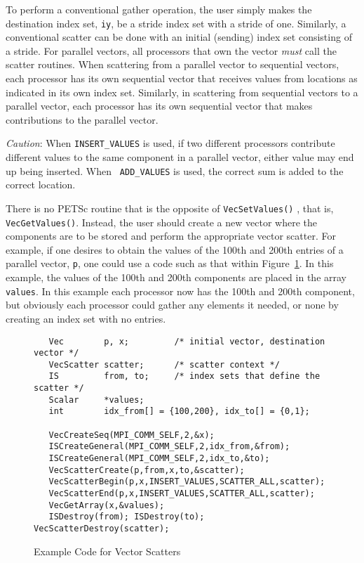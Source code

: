 To perform a conventional gather operation, the user simply makes
 the destination index set, 
{\tt iy}, be a stride index set with a stride of one.  Similarly, a 
conventional scatter can be done with an initial (sending) index set 
consisting of a stride.  For parallel vectors, all processors that own 
the vector {\em must} call the scatter routines. When scattering from a 
parallel vector to sequential vectors, each processor has its own sequential 
vector that receives values from locations as indicated in its own 
index set. Similarly, in scattering
from sequential vectors to a parallel vector, each processor has its
own sequential vector that makes contributions to the parallel vector.

{\em Caution}: When {\tt INSERT\_VALUES} is used, if two different
processors contribute different values to the same component in a
parallel vector, either value may end up being inserted. When {\tt
ADD\_VALUES} is used, the correct sum is added to the correct
location.

 
There is no PETSc routine that is the opposite of {\tt VecSetValues()}
, that is, {\tt VecGetValues()}. 
Instead, the user should create a new vector where
the components are to be stored and perform the appropriate vector 
scatter. For example, if one desires to obtain the values of the 
100th and 200th entries of a parallel vector, {\tt p}, one could use 
a code such as that within Figure~\ref{fig:vecscatter}.
In this example, the values of the 100th and 200th components are
placed in the array 
{\tt values}. In this example each processor now has the 100th and 
200th component, but obviously each processor could gather any 
elements it needed, or none by creating an index set with no entries.

\begin{figure}[tb]
\begin{verbatim}
   Vec        p, x;         /* initial vector, destination vector */
   VecScatter scatter;      /* scatter context */
   IS         from, to;     /* index sets that define the scatter */
   Scalar     *values;
   int        idx_from[] = {100,200}, idx_to[] = {0,1};

   VecCreateSeq(MPI_COMM_SELF,2,&x);
   ISCreateGeneral(MPI_COMM_SELF,2,idx_from,&from);
   ISCreateGeneral(MPI_COMM_SELF,2,idx_to,&to);
   VecScatterCreate(p,from,x,to,&scatter);
   VecScatterBegin(p,x,INSERT_VALUES,SCATTER_ALL,scatter);
   VecScatterEnd(p,x,INSERT_VALUES,SCATTER_ALL,scatter);
   VecGetArray(x,&values);
   ISDestroy(from); ISDestroy(to); VecScatterDestroy(scatter);
\end{verbatim}
\caption{Example Code for Vector Scatters}
\label{fig:vecscatter}
\end{figure}

